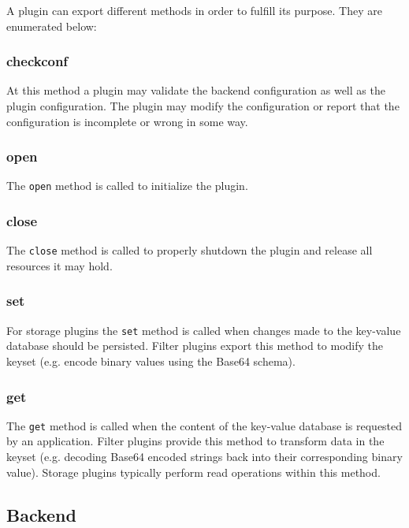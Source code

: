 A plugin can export different methods in order to fulfill its purpose.
They are enumerated below:

\subsubsection{checkconf}\label{checkconf}

At this method a plugin may validate the backend configuration as well as
the plugin configuration. The plugin may modify the configuration or
report that the configuration is incomplete or wrong in some way.

\subsubsection{open}\label{open}

The \texttt{open} method is called to initialize the plugin.

\subsubsection{close}\label{close}

The \texttt{close} method is called to properly shutdown the plugin and
release all resources it may hold.

\subsubsection{set}\label{set}

For storage plugins the \texttt{set} method is called when changes made to the key-value
database should be persisted.
Filter plugins export this method to modify the keyset (e.g. encode binary values using the Base64 schema).

\subsubsection{get}\label{get}

The \texttt{get} method is called when the content of the key-value
database is requested by an application.
Filter plugins provide this method to transform data in the keyset (e.g. decoding Base64 encoded strings back into their corresponding binary value).
Storage plugins typically perform read operations within this method.

\subsection{Backend}

